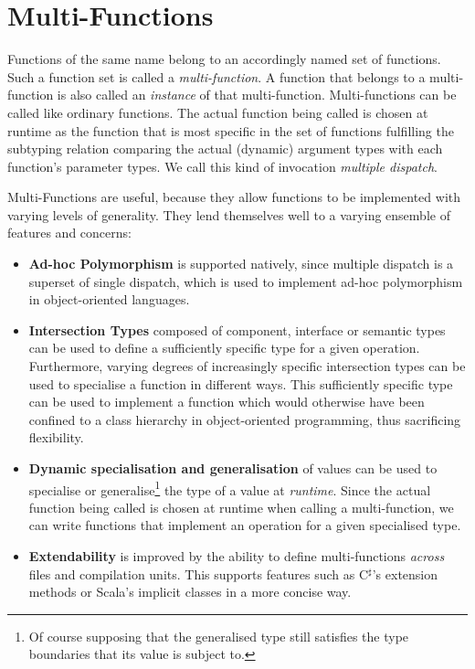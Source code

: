 \chapter{Multi-Functions}

Functions of the same name belong to an accordingly named set of functions. Such a function set is called a \textit{multi-function}. A function that belongs to a multi-function is also called an \textit{instance} of that multi-function. Multi-functions can be called like ordinary functions. The actual function being called is chosen at runtime as the function that is most specific in the set of functions fulfilling the subtyping relation comparing the actual (dynamic) argument types with each function's parameter types. We call this kind of invocation \textit{multiple dispatch}. 

Multi-Functions are useful, because they allow functions to be implemented with varying levels of generality. They lend themselves well to a varying ensemble of features and concerns:
\begin{itemize}
	\item \textbf{Ad-hoc Polymorphism} is supported natively, since multiple dispatch is a superset of single dispatch, which is used to implement ad-hoc polymorphism in object-oriented languages.
	\item \textbf{Intersection Types} composed of component, interface or semantic types can be used to define a sufficiently specific type for a given operation. Furthermore, varying degrees of increasingly specific intersection types can be used to specialise a function in different ways. This sufficiently specific type can be used to implement a function which would otherwise have been confined to a class hierarchy in object-oriented programming, thus sacrificing flexibility.
	\item \textbf{Dynamic specialisation and generalisation} of values can be used to specialise or generalise\footnote{Of course supposing that the generalised type still satisfies the type boundaries that its value is subject to.} the type of a value at \textit{runtime}. Since the actual function being called is chosen at runtime when calling a multi-function, we can write functions that implement an operation for a given specialised type.
	\item \textbf{Extendability} is improved by the ability to define multi-functions \textit{across} files and compilation units. This supports features such as C$^\sharp$'s extension methods or Scala's implicit classes in a more concise way.
\end{itemize}

